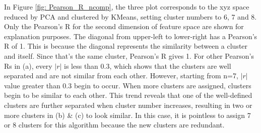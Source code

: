 \documentclass[a4paper]{article}
\begin{document}
In Figure \ref{fig: Pearson_R_ncomp}, the three plot corresponds to the xyz space reduced by PCA and clustered by KMeans, setting cluster numbers to 6, 7 and 8. Only the Pearson's R for the second dimension of feature space are shown for explanation purposes. The diagonal from upper-left to lower-right has a Pearson's R of 1. This is because the diagonal represents the similarity between a cluster and itself. Since that's the same cluster, Pearson's R gives 1. For other Pearson's Rs in (a), every \(|r|\) is less than 0.3, which shows that the clusters are well separated and are not similar from each other. However, starting from n=7, \(|r|\) value greater than 0.3 begin to occur. When more clusters are assigned, clusters begin to be similar to each other. This trend reveals that one of the well-defined clusters are further separated when cluster number increases, resulting in two or more clusters in (b) \& (c) to look similar. In this case, it is pointless to assign 7 or 8 clusters for this algorithm because the new clusters are redundant.
\end{document}
